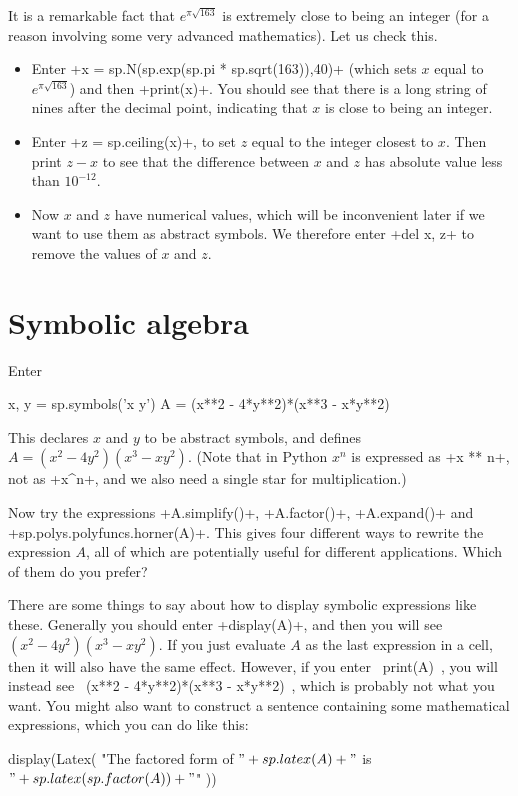 \documentclass[a4paper,10pt]{amsbook}
\begin{document}
\begin{exercise}\label{ex-near-int}
 It is a remarkable fact that $e^{\pi\sqrt{163}}$ is extremely close
 to being an integer (for a reason involving some very advanced
 mathematics).  Let us check this. 
 \begin{itemize}
  \item[(x)] Enter
   \pcode+x = sp.N(sp.exp(sp.pi * sp.sqrt(163)),40)+ (which sets
   $x$ equal to $e^{\pi\sqrt{163}}$) and then \pcode+print(x)+.  You
   should see that there is a long string of nines after the decimal
   point, indicating that $x$ is close to being an integer.
  \item[(c)] Enter \pcode+z = sp.ceiling(x)+, to set $z$ equal to the
   integer closest to $x$.  Then print $z-x$ to see that the
   difference between $x$ and $z$ has absolute value less than
   $10^{-12}$. 
  \item[(d)] Now $x$ and $z$ have numerical values, which will be
   inconvenient later if we want to use them as abstract symbols.  We
   therefore enter \pcode+del x, z+ to remove the values of $x$ and
   $z$. 
 \end{itemize}
\end{exercise}

\section{Symbolic algebra}

\begin{exercise}\label{ex-horner}
 Enter
\begin{pcodeblock}
  x, y = sp.symbols('x y')
  A = (x**2 - 4*y**2)*(x**3 - x*y**2)
\end{pcodeblock}
 This declares $x$ and $y$ to be abstract symbols, and defines
 $A=(x^2-4y^2)(x^3-xy^2)$.  (Note that in Python $x^n$ is expressed
 as \pcode+x ** n+, not as \pcode+x^n+, and we also need a single star
 for multiplication.)  
 
 Now try the expressions \pcode+A.simplify()+,
 \pcode+A.factor()+, \pcode+A.expand()+ and 
 \pcode+sp.polys.polyfuncs.horner(A)+.  This gives four different ways
 to rewrite the expression $A$, all of which are potentially useful
 for different applications.  Which of them do you prefer?

 There are some things to say about how to display symbolic
 expressions like these.  Generally you should enter
 \pcode+display(A)+, and then you will see $(x^2-4y^2)(x^3-xy^2)$.  If
 you just evaluate $A$ as the last expression in a cell, then it will
 also have the same effect.  However, if you enter \pcode~print(A)~,
 you will instead see \pcode~(x**2 - 4*y**2)*(x**3 - x*y**2)~, which
 is probably not what you want.  You might also want to construct a
 sentence containing some mathematical expressions, which you can do
 like this:
 \begin{pcodeblock}
  display(Latex(
   "The factored form of $" + sp.latex(A) + "$ is $" + 
   sp.latex(sp.factor(A)) + "$"
  ))
 \end{pcodeblock}
\end{exercise}
\end{document}
